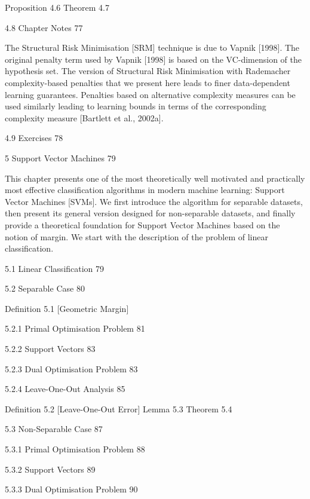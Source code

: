 Proposition 4.6
Theorem 4.7

4.8 Chapter Notes 77

The Structural Risk Minimisation [SRM] technique is due to Vapnik [1998]. The original penalty term used by Vapnik [1998] is based on the VC-dimension of the hypothesis set. The version of Structural Risk Minimisation with Rademacher complexity-based penalties that we present here leads to finer data-dependent learning guarantees. Penalties based on alternative complexity measures can be used similarly leading to learning bounds in terms of the corresponding complexity measure [Bartlett et al., 2002a].

4.9 Exercises 78



5 Support Vector Machines 79

This chapter presents one of the most theoretically well motivated and practically most effective classification algorithms in modern machine learning: Support Vector Machines [SVMs]. We first introduce the algorithm for separable datasets, then present its general version designed for non-separable datasets, and finally provide a theoretical foundation for Support Vector Machines based on the notion of margin. We start with the description of the problem of linear classification.

5.1 Linear Classification 79



5.2 Separable Case 80

Definition 5.1 [Geometric Margin]

5.2.1 Primal Optimisation Problem 81



5.2.2 Support Vectors 83



5.2.3 Dual Optimisation Problem 83



5.2.4 Leave-One-Out Analysis 85

Definition 5.2 [Leave-One-Out Error]
Lemma 5.3
Theorem 5.4

5.3 Non-Separable Case 87



5.3.1 Primal Optimisation Problem 88



5.3.2 Support Vectors 89



5.3.3 Dual Optimisation Problem 90



